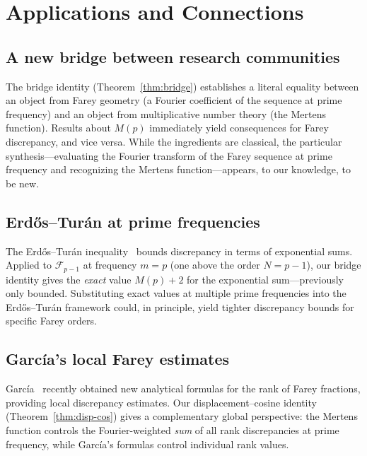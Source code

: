 \documentclass[11pt]{article}
\theoremstyle{definition}
\newcommand{\F}{\mathcal{F}}
\begin{document}
\section{Applications and Connections}\label{sec:connections}

\subsection{A new bridge between research communities}

The bridge identity (Theorem~\ref{thm:bridge}) establishes a
literal equality between an object from Farey geometry (a Fourier
coefficient of the sequence at prime frequency) and an object from
multiplicative number theory (the Mertens function).  Results about
$M(p)$ immediately yield consequences for Farey discrepancy, and
vice versa.  While the ingredients are classical, the particular
synthesis---evaluating the Fourier transform of the Farey sequence
at prime frequency and recognizing the Mertens function---appears,
to our knowledge, to be new.

\subsection{Erd\H{o}s--Tur\'an at prime frequencies}

The Erd\H{o}s--Tur\'an inequality~\cite{ErdosTuran1948} bounds
discrepancy in terms of exponential sums.  Applied to $\F_{p-1}$
at frequency $m = p$ (one above the order $N = p-1$), our bridge
identity gives the \emph{exact} value $M(p) + 2$ for the
exponential sum---previously only bounded.  Substituting exact
values at multiple prime frequencies into the Erd\H{o}s--Tur\'an
framework could, in principle, yield tighter discrepancy bounds
for specific Farey orders.

\subsection{Garc\'ia's local Farey estimates}

Garc\'ia~\cite{Garcia2025} recently obtained new analytical formulas
for the rank of Farey fractions, providing local discrepancy
estimates.  Our displacement--cosine identity (Theorem~\ref{thm:disp-cos})
gives a complementary global perspective: the Mertens function
controls the Fourier-weighted \emph{sum} of all rank discrepancies
at prime frequency, while Garc\'ia's formulas control individual
rank values.
\end{document}
